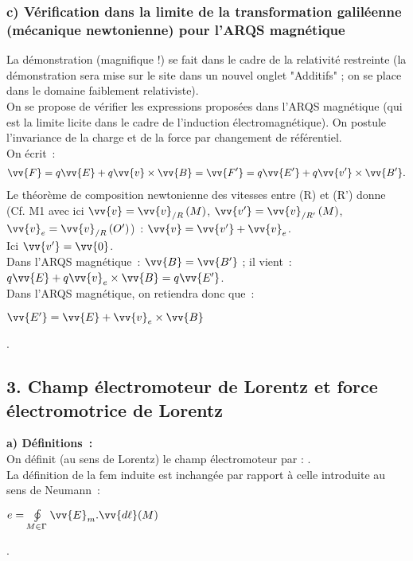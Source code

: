 \documentclass{article}
\newcommand{\mathcolorbox}[2]{\colorbox{#1}{$#2$}}
\let\oldoint\oint
\renewcommand{\oint}{\oldoint\limits}
\renewcommand\overrightarrow{\vv}
\begin{document}
\subsubsection*{c) Vérification dans la limite de la transformation
galiléenne (mécanique newtonienne) pour l'ARQS magnétique}
La démonstration (magnifique !) se fait dans le cadre de
la relativité restreinte (la démonstration sera mise sur le site
dans un nouvel onglet
"Additifs" ; on se place dans le domaine faiblement relativiste). \\
On se propose de vérifier les expressions proposées dans l'ARQS
magnétique (qui est la limite licite dans le cadre de l'induction
électromagnétique). On postule l'invariance de la charge et de la
force par
changement de référentiel. \\
On écrit :
\begin{eqnarray}\label{Eq.10}
\overrightarrow{F}=q\overrightarrow{E}+q\overrightarrow{v}\times\overrightarrow{B}
=
\overrightarrow{F'}=q\overrightarrow{E'}+q\overrightarrow{v'}\times\overrightarrow{B'}.
\end{eqnarray}
Le théorème de composition newtonienne des vitesses entre (R) et
(R') donne (Cf. M1 avec ici $\overrightarrow{v} =
\overrightarrow{v}_{/R}\left(M\right)$, $\overrightarrow{v'} =
\overrightarrow{v}_{/R'}\left(M\right)$, $\overrightarrow{v}_{e} =
\overrightarrow{v}_{/R}\left(O'\right)$) : $\overrightarrow{v} =
\overrightarrow{v'}+\overrightarrow{v}_{e}$. \\
Ici $\overrightarrow{v'} = \overrightarrow{0}$. \\
Dans l'ARQS magnétique : $\overrightarrow{B} = \overrightarrow{B'}$
; il vient : $q\overrightarrow{E}+q\overrightarrow{v}_{e} \times
\overrightarrow{B} = q\overrightarrow{E'}$. \\
Dans l'ARQS magnétique, on retiendra donc que : \\
\centerline{\mathcolorbox{gray!20}{\overrightarrow{E'}=\overrightarrow{E}+\overrightarrow{v}_{e}
\times \overrightarrow{B}}}.

\subsection*{3. Champ électromoteur de Lorentz et force électromotrice
de Lorentz} \textbf{ a)  Définitions :} \\
On définit (au sens de Lorentz) le champ électromoteur par
: \fbox{$\overrightarrow{E}_{m}=\overrightarrow{v}_{e}\times
\overrightarrow{B}$}.
\\
La définition de la fem induite est inchangée par rapport à celle introduite au sens de Neumann : \\
\centerline{\mathcolorbox{gray!20}{e=\oint_{M\in
\Gamma}\overrightarrow{E}_{m}.\overrightarrow{d\ell}(M)}}.
\end{document}
